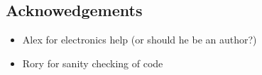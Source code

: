 \documentclass{article}
\begin{document}
\begin{multicols}{2}
\section{Acknowedgements}
\begin{itemize}
\item Alex for electronics help (or should he be an author?)
\item Rory for sanity checking of code
\end{itemize}




\end{multicols}
\end{document}
